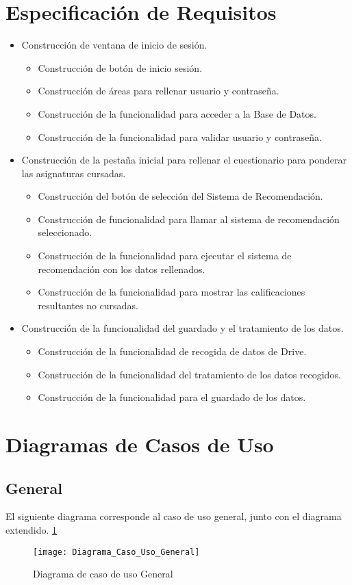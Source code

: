 \section{Especificación de Requisitos}
\begin{itemize}
\item Construcción de ventana de inicio de sesión. 
\begin{itemize}
\item Construcción de botón de inicio sesión. 
\item Construcción de áreas para rellenar usuario y contraseña.  
\item Construcción de la funcionalidad para acceder a la Base de Datos. 
\item Construcción de la funcionalidad para validar usuario y contraseña. 
\end{itemize}
\item Construcción de la pestaña inicial para rellenar el cuestionario para ponderar las asignaturas cursadas. 
\begin{itemize}
\item Construcción del botón de selección del Sistema de Recomendación.
\item Construcción de funcionalidad para llamar al sistema de recomendación  seleccionado. 
\item Construcción de la funcionalidad para ejecutar el sistema de recomendación con los datos rellenados. 
\item Construcción de la funcionalidad para mostrar las calificaciones resultantes no cursadas. 
\end{itemize}
\item Construcción de la funcionalidad del guardado y  el tratamiento de los datos. 
\begin{itemize}
\item Construcción de la funcionalidad de recogida de datos de Drive. 
\item Construcción de la funcionalidad del tratamiento de los datos recogidos. 
\item Construcción de la funcionalidad para el guardado de los datos. 
\end{itemize}
\end{itemize}

\section{Diagramas de Casos de Uso}
\subsection{General}
El siguiente diagrama corresponde al  caso de uso general, junto con el diagrama extendido. \ref{fig:Diagrama_Caso_Uso_General}
\begin{figure}[h]
\centering
\texttt{[image: Diagrama\_Caso\_Uso\_General]}
\caption{Diagrama de caso de uso General}
\label{fig:Diagrama_Caso_Uso_General}
\end{figure}